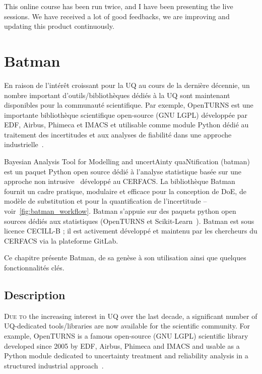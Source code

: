 This online course has been run twice, and I have been presenting the live sessions. We have received a lot of good feedbacks, we are improving and updating this product continuously.


\chapter{Batman}\label{chap:batman}

\begin{chapquote}
En raison de l'intérêt croissant pour la UQ au cours de la dernière décennie, un nombre important d'outils/bibliothèques dédiés à la UQ sont maintenant disponibles pour la communauté scientifique. Par exemple, OpenTURNS est une importante bibliothèque scientifique open-source (GNU LGPL) développée par EDF, Airbus, Phimeca et IMACS et utilisable comme module Python dédié au traitement des incertitudes et aux analyses de fiabilité dans une approche industrielle~\citep{Baudin2015}.

Bayesian Analysis Tool for Modelling and uncertAinty quaNtification (batman) est un paquet Python open source dédié à l'analyse statistique basée sur une approche non intrusive~\cite{Roy2018b} développé au CERFACS. La bibliothèque Batman fournit un cadre pratique, modulaire et efficace pour la conception de DoE, de modèle de substitution et pour la quantification de l'incertitude -- voir~\cref{fig:batman_workflow}. Batman s'appuie sur des paquets python open sources dédiés aux statistiques (OpenTURNS et Scikit-Learn~\citep{pedregosa2011}). Batman est sous licence CECILL-B ; il est activement développé et maintenu par les chercheurs du CERFACS via la plateforme GitLab. 

Ce chapitre présente Batman, de sa genèse à son utilisation ainsi que quelques fonctionnalités clés.
\end{chapquote}

\section{Description}

\lettrine{D}{ue to} the increasing interest in UQ over the last decade, a significant number of UQ-dedicated tools/libraries are now available for the scientific community. For example, OpenTURNS is a famous open-source (GNU LGPL) scientific library developed since 2005 by EDF, Airbus, Phimeca and IMACS and usable as a Python module dedicated to uncertainty treatment and reliability analysis in a structured industrial approach~\citep{Baudin2015}.

